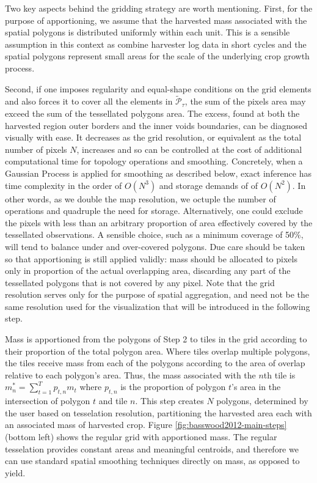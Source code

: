  Two key aspects behind the
gridding strategy are worth mentioning. First, for the purpose of
apportioning, we assume that the harvested mass associated with the
spatial polygons is distributed uniformly within each unit. This is a
sensible assumption in this context as combine harvester log data in
short cycles and the spatial polygons represent small areas for the
scale of the underlying crop growth process.

 Second, if one imposes regularity
and equal-shape conditions on the grid elements and also forces it to
cover all the elements in $\tilde{\mathcal{P}}_{\tau}$, the sum of the
pixels area may exceed the sum of the tessellated polygons area. The
excess, found at both the harvested region outer borders and the inner
voids boundaries, can be diagnosed visually with ease. It decreases as
the grid resolution, or equivalent as the total number of pixels $N$,
increases and so can be controlled at the cost of additional
computational time for topology operations and smoothing. %
Concretely, when a Gaussian Process is applied for smoothing as
described below, exact inference has time complexity in the order of
$O(N^3)$ and storage demands of of $O(N^2)$. In other words, as we
double the map resolution, we octuple the number of operations and
quadruple the need for storage.  Alternatively, one could exclude the
pixels with less than an arbitrary proportion of area effectively
covered by the tessellated observations. A sensible choice, such as a
minimum coverage of 50\%, will tend to balance under and over-covered
polygons. Due care should be taken so that apportioning is still
applied validly: mass should be allocated to pixels only in proportion
of the actual overlapping area, discarding any part of the tessellated
polygons that is not covered by any pixel. Note that the grid
resolution serves only for the purpose of spatial aggregation, and
need not be the same resolution used for the visualization that will
be introduced in the following step.

Mass is apportioned from the polygons of Step 2 to tiles in the grid
according to their proportion of the total polygon area. Where tiles
overlap multiple polygons, the tiles receive mass from each of the
polygons according to the area of overlap relative to each polygon's
area.  Thus, the mass associated with the $n$th tile is
$m_n^* = \sum_{t=1}^T p_{t,n} m_t$ where $p_{t,n}$ is the proportion
of polygon $t$'s area in the intersection of polygon $t$ and tile $n$.
This step creates $N$ polygons, determined by the user based on
tesselation resolution, partitioning the harvested area each with an
associated mass of harvested crop. Figure
\ref{fig:basswood2012-main-steps} (bottom left) shows the regular grid
with apportioned mass. The regular tesselation provides constant areas
and meaningful centroids, and therefore we can use standard spatial
smoothing techniques directly on mass, as opposed to yield.

